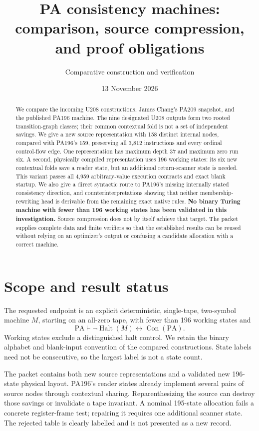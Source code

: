 \documentclass[11pt,letterpaper]{article}
\title{PA consistency machines:\\comparison, source compression, and proof obligations}
\author{Comparative construction and verification}
\date{13 November 2026}
\newcommand{\PA}{\mathrm{PA}}
\newcommand{\Con}{\operatorname{Con}}
\begin{document}
\maketitle
\begin{abstract}
We compare the incoming U208 constructions, James Chang's PA209 snapshot,
and the published PA196 machine. The nine designated U208 outputs form two
rooted transition-graph classes; their common contextual fold is not a set
of independent savings. We give a new source representation with 158
distinct internal nodes, compared with PA196's 159, preserving all 3,812
instructions and every ordinal control-flow edge. One representation has maximum depth
37 and maximum zero run six. A second, physically compiled representation
uses 196 working states: its six new contextual folds save a reader state,
but an additional return-scanner state is needed. This variant passes
all 4,959 arbitrary-value execution contracts and exact blank startup. We also give a direct
syntactic route to PA196's missing internally stated consistency direction,
and counterinterpretations showing that neither membership-rewriting head
is derivable from the remaining exact native rules. \textbf{No binary
Turing machine with fewer than 196 working states has been validated in
this investigation.} Source compression does not by itself achieve that
target. The packet supplies complete data and finite verifiers so that the
established results can be reused without relying on an optimizer's output
or confusing a candidate allocation with a correct machine.
\end{abstract}

\section{Scope and result status}

The requested endpoint is an explicit deterministic, single-tape,
two-symbol machine $M$, starting on an all-zero tape, with fewer than 196
working states and
\[
       \PA\vdash \neg\operatorname{Halt}(M)\leftrightarrow\Con(\PA).
\]
Working states exclude a distinguished halt control. We retain the binary
alphabet and blank-input convention of the compared constructions. State
labels need not be consecutive, so the largest label is not a state count.

The packet contains both new source representations and a validated new
196-state physical layout. PA196's reader states already implement several
pairs of source nodes through contextual sharing. Reparenthesizing the
source can destroy those savings or invalidate a tape invariant. A nominal
195-state allocation fails a concrete register-frame test; repairing it
requires one additional scanner state. The rejected table is clearly
labelled and is not presented as a new record.
\end{document}
